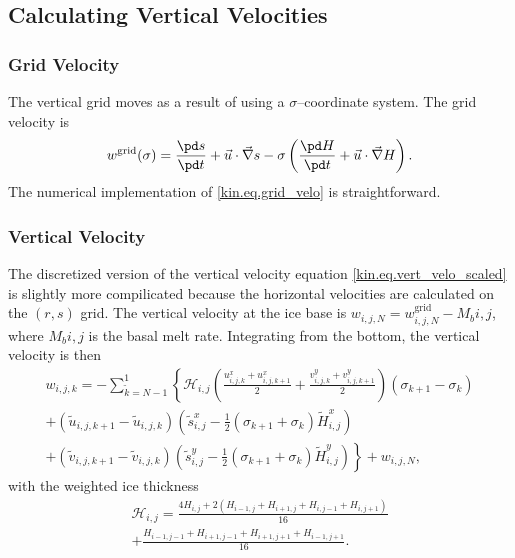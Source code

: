 \subsection{Calculating Vertical Velocities}

\subsubsection{Grid Velocity}
The vertical grid moves as a result of using a $\sigma$--coordinate system. The grid velocity is
\begin{equation}
  \label{kin.eq.grid_velo}
  w^{\text{grid}}(\sigma)=\frac{\pd s}{\pd t}+\vec u\cdot\vec\nabla s-\sigma\left(\frac{\pd H}{\pd t}+\vec u\cdot\vec\nabla H\right).
\end{equation}
The numerical implementation of \eqref{kin.eq.grid_velo} is straightforward.

\subsubsection{Vertical Velocity}
The discretized version of the vertical velocity equation \eqref{kin.eq.vert_velo_scaled} is slightly more compilicated because the horizontal velocities are calculated on the $(r,s)$ grid. The vertical velocity at the ice base is $w_{i,j,N}=w^{\text{grid}}_{i,j,N}-M_b{i,j}$, where $M_b{i,j}$ is the basal melt rate. Integrating from the bottom, the vertical velocity is then
\begin{equation}
  \label{kin.eq.wvel_unc}
  \begin{split}
  w_{i,j,k}=-\sum_{\tilde{k}=N-1}^1\left\{\mathcal{H}_{i,j}\left(\frac{u^x_{i,j,k}+u^x_{i,j,k+1}}{2}+\frac{v^y_{i,j,k}+v^y_{i,j,k+1}}{2}\right)(\sigma_{k+1}-\sigma_k)\right. \\
     +(\tilde{u}_{i,j,k+1}-\tilde{u}_{i,j,k})  \left(\tilde{s}^x_{i,j}-\frac12(\sigma_{k+1}+\sigma_k)\tilde{H}^x_{i,j}\right)  \\
     \left.+(\tilde{v}_{i,j,k+1}-\tilde{v}_{i,j,k})  \left(\tilde{s}^y_{i,j}-\frac12(\sigma_{k+1}+\sigma_k)\tilde{H}^y_{i,j}\right)\right\} + w_{i,j,N},
  \end{split}
\end{equation}
with the weighted ice thickness
\begin{equation*}
  \begin{split}
  \mathcal{H}_{i,j}=\frac{4H_{i,j}+2(H_{i-1,j}+H_{i+1,j}+H_{i,j-1}+H_{i,j+1})}{16}\\
  +\frac{H_{i-1,j-1}+H_{i+1,j-1}+H_{i+1,j+1}+H_{i-1,j+1}}{16}.    
  \end{split}
\end{equation*}

